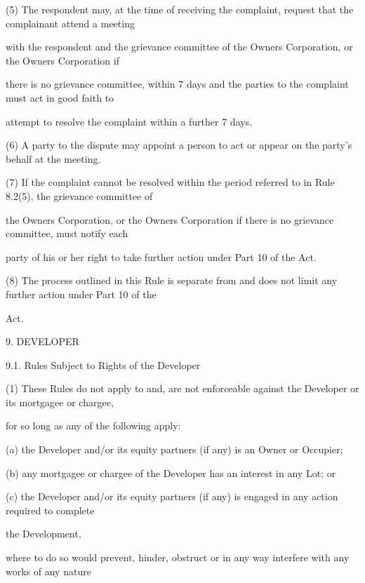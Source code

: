 \documentclass{article}
\begin{document}
{\fontsize{9.962}{1}(5) The respondent may, at the time of receiving the complaint, request that the complainant attend a meeting }

{\fontsize{10.02}{1}with the respondent and the grievance committee of the Owners Corporation, or the Owners Corporation if }

{\fontsize{10.02}{1}there is no grievance committee, within 7 days and the parties to the complaint must act in good faith to }

{\fontsize{10.02}{1}attempt to resolve the complaint within a further 7 days. }

{\fontsize{9.962}{1}(6) A party to the dispute may appoint a person to act or appear on the party’s behalf at the meeting. }

{\fontsize{9.962}{1}(7) If the complaint cannot be resolved within the period referred to in Rule 8.2(5), the grievance committee of }

{\fontsize{10.02}{1}the Owners Corporation, or the Owners Corporation if there is no grievance committee, must notify each }

{\fontsize{10.02}{1}party of his or her right to take further action under Part 10 of the Act. }

{\fontsize{9.962}{1}(8) The process outlined in this Rule is separate from and does not limit any further action under Part 10 of the }

{\fontsize{10.02}{1}Act. }


{\fontsize{9.99}{1}9. DEVELOPER }

{\fontsize{9.99}{1}9.1. Rules Subject to Rights of the Developer }

{\fontsize{9.962}{1}(1) These Rules do not apply to and, are not enforceable against the Developer or its mortgagee or chargee, }

{\fontsize{10.02}{1}for so long as any of the following apply: }

{\fontsize{9.962}{1}(a) the Developer and/or its equity partners (if any) is an Owner or Occupier; }

{\fontsize{9.962}{1}(b) any mortgagee or chargee of the Developer has an interest in any Lot; or }

{\fontsize{9.962}{1}(c) the Developer and/or its equity partners (if any) is engaged in any action required to complete }

{\fontsize{10.02}{1}the Development, }

{\fontsize{10.02}{1}where to do so would prevent, hinder, obstruct or in any way interfere with any works of any nature }
\end{document}
